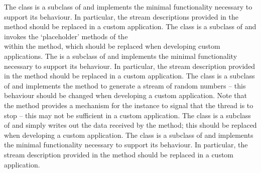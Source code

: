The  class is a subclass of
 and implements the minimal functionality necessary
to support its behaviour.
In particular, the stream descriptions provided in the method
 should be replaced in a custom application.
The  class is a subclass of
 and invokes the `placeholder' methods of the\\
 within the  method, which should
be replaced when developing custom applications.
The  is a subclass of
 and implements the minimal functionality necessary
to support its behaviour.
In particular, the stream description provided in the method
 should be replaced in a custom application.
The  class is a subclass of
 and implements the  method to generate a stream of
random numbers -- this behaviour should be changed when developing a custom application.
Note that the method  provides a mechanism for the
 instance to signal that the thread is to
stop -- this may not be sufficient in a custom application.
The  class is a subclass of
 and simply writes out the data received by the
 method; this should be replaced when developing a custom application.
The  class is a subclass of
 and implements the minimal functionality necessary
to support its behaviour.
In particular, the stream description provided in the method
 should be replaced in a custom application.
